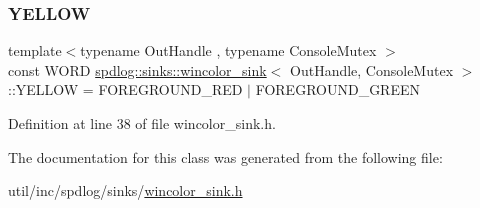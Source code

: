 \subsubsection{\texorpdfstring{Y\+E\+L\+L\+OW}{YELLOW}}
{\footnotesize\ttfamily template$<$typename Out\+Handle , typename Console\+Mutex $>$ \\
const W\+O\+RD \hyperlink{classspdlog_1_1sinks_1_1wincolor__sink}{spdlog\+::sinks\+::wincolor\+\_\+sink}$<$ Out\+Handle, Console\+Mutex $>$\+::Y\+E\+L\+L\+OW = F\+O\+R\+E\+G\+R\+O\+U\+N\+D\+\_\+\+R\+ED $\vert$ F\+O\+R\+E\+G\+R\+O\+U\+N\+D\+\_\+\+G\+R\+E\+EN}



Definition at line 38 of file wincolor\+\_\+sink.\+h.



The documentation for this class was generated from the following file\+:\begin{DoxyCompactItemize}
\item 
util/inc/spdlog/sinks/\hyperlink{wincolor__sink_8h}{wincolor\+\_\+sink.\+h}\end{DoxyCompactItemize}
